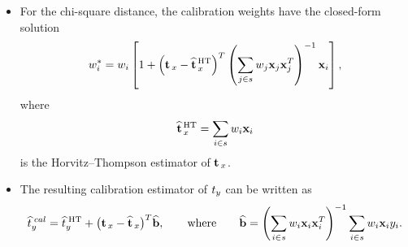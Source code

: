 \documentclass{my_eth_beamer}
\numberwithin{equation}{section}
\begin{document}
\begin{frame}
    \begin{itemize}
    \setlength{\itemsep}{10pt}
        \item For the chi-square distance, the \alert{calibration weights}
            have the closed-form solution
            \begin{equation*}
                w_i^* =
                w_i\left[
                    1+
                    \Big(\bold{t}_{\,x} - \widehat{\bold{t}}_{\,x}^{\,\mathrm{HT}}\Big)^T
                    \left(
                        \sum_{j\in s}w_j\bold{x}_j\bold{x}_j^T
                    \right)^{-1}
                    \bold{x}_i
                \right],
            \end{equation*}
            where
            \begin{equation*}
                \widehat{\bold{t}}_{\,x}^{\,\mathrm{HT}}=\sum_{i\in s}w_i\bold{x}_i
            \end{equation*}
            is the Horvitz--Thompson estimator of $\bold{t}_{\,x}$.
        \item The resulting \alert{calibration estimator} of $t_y$ can be
            written as
            \begin{equation*}
                \widehat t_y^{\;cal} = \widehat{t}^{\;\mathrm{HT}}_y +
                \big(\bold{t}_{\,x} - \widehat{\bold{t}}_{\,x}\big)^T\widehat{\bold{b}},
                \qquad \text{where} \qquad
                \widehat{\bold{b}} = \left(
                    \sum_{i\in s}w_i\bold{x}_i\bold{x}_i^T
                \right)^{-1}
                \sum_{i\in s}w_i\bold{x}_i y_i.
            \end{equation*}
    \end{itemize}
\end{frame}
\end{document}
